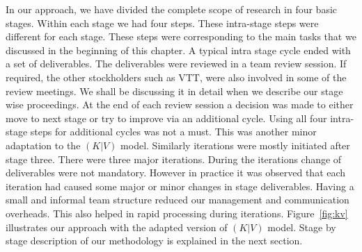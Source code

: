  In our approach, we have divided the complete scope of research in four basic stages. Within each stage we had four steps. These intra-stage steps were different for each stage. These steps were corresponding to the main tasks that we discussed in the beginning of this chapter. A typical intra stage cycle ended with a set of deliverables. The deliverables were reviewed in a team review session. If required, the other stockholders such as VTT, were also involved in some of the review meetings. We shall be discussing it in detail when we describe our stage wise proceedings. At the end of each review session a decision was made to either move to next stage or try to improve via an additional cycle. Using all four intra-stage steps for additional cycles was not a must. This was another minor adaptation to the \((K|V)\) model. Similarly iterations were mostly initiated after stage three. There were three major iterations. During the iterations change of deliverables were not mandatory. However in practice it was observed that each iteration had caused some major or minor changes in stage deliverables. Having a small and informal team structure reduced our management and communication overheads. This also helped in rapid processing during iterations. Figure~\ref{fig:kv} illustrates our approach with the adapted version of \((K|V)\) model. Stage by stage description of our methodology is explained in the next section.   
